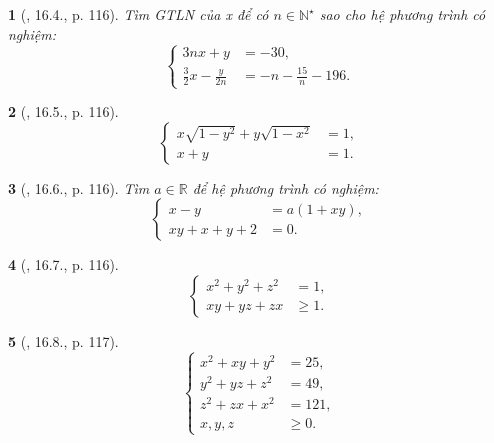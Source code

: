 \documentclass{article}
\newtheorem{baitoan}{}
\begin{document}
\begin{baitoan}[\cite{TLCT_THCS_Toan_9_dai_so}, 16.4., p. 116]
	Tìm {\rm GTLN} của x để có $n\in\mathbb{N}^\star$ sao cho hệ phương trình có nghiệm:
	\begin{equation*}
		\left\{\begin{split}
			3nx + y &= -30,\\
			\frac{3}{2}x - \frac{y}{2n} &= -n - \frac{15}{n} - 196.
		\end{split}\right.
	\end{equation*}
\end{baitoan}

\begin{baitoan}[\cite{TLCT_THCS_Toan_9_dai_so}, 16.5., p. 116]
	\begin{equation*}
		\left\{\begin{split}
			x\sqrt{1 - y^2} + y\sqrt{1 - x^2} &= 1,\\
			x + y &= 1.
		\end{split}\right.
	\end{equation*}
\end{baitoan}

\begin{baitoan}[\cite{TLCT_THCS_Toan_9_dai_so}, 16.6., p. 116]
	Tìm $a\in\mathbb{R}$ để hệ phương trình có nghiệm:
	\begin{equation*}
		\left\{\begin{split}
			x - y &= a(1 + xy),\\
			xy + x + y + 2 &= 0.
		\end{split}\right.
	\end{equation*}
\end{baitoan}

\begin{baitoan}[\cite{TLCT_THCS_Toan_9_dai_so}, 16.7., p. 116]
	\begin{equation*}
		\left\{\begin{split}
			x^2 + y^2 + z^2 &= 1,\\
			xy + yz + zx&\ge1.
		\end{split}\right.
	\end{equation*}
\end{baitoan}

\begin{baitoan}[\cite{TLCT_THCS_Toan_9_dai_so}, 16.8., p. 117]
	\begin{equation*}
		\left\{\begin{split}
			x^2 + xy + y^2 &= 25,\\
			y^2 + yz + z^2 &= 49,\\
			z^2 + zx + x^2 &= 121,\\
			x,y,z&\ge0.
		\end{split}\right.
	\end{equation*}
\end{baitoan}
\end{document}
